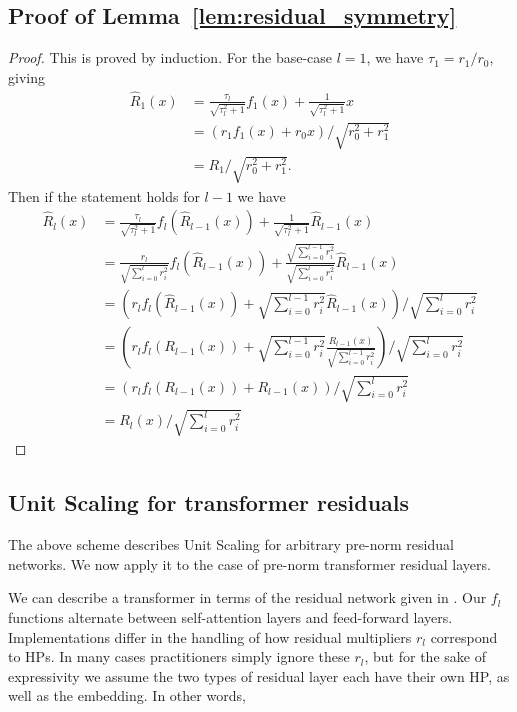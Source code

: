 \subsection{Proof of Lemma~\ref{lem:residual_symmetry}}
\begin{proof}
    This is proved by induction. For the base-case $l=1$, we have $\tau_1 = r_1/r_0$, giving
    \begin{align*}
        \hat{R}_{1}(x) &= \frac{\tau_l}{\sqrt{\tau_l^2 + 1}}f_1(x) + \frac{1}{\sqrt{\tau^2_l + 1}}x
        \\
        &= (r_1f_1(x) + r_0x) / \sqrt{r_0^2 + r_1^2}
        \\
        &= R_1 / \sqrt{r_0^2 + r_1^2}.
    \end{align*}
    Then if the statement holds for $l-1$ we have
    \begin{align*}
        \hat{R}_{l}(x) &= \frac{\tau_l}{\sqrt{\tau^2_l + 1}}f_l(\hat{R}_{l-1}(x)) + \frac{1}{\sqrt{\tau^2_l + 1}}\hat{R}_{l-1}(x)
        \\
        &= \frac{r_l}{\sqrt{\sum_{i=0}^{l}r_i^2}}f_l(\hat{R}_{l-1}(x)) + \frac{\sqrt{ \sum_{i=0}^{l-1}r_i^2}}{\sqrt{\sum_{i=0}^{l}r_i^2}}\hat{R}_{l-1}(x)
        \\
        &= \left(r_l f_l(\hat{R}_{l-1}(x)) + \sqrt{\sum_{i=0}^{l-1}r_i^2} \hat{R}_{l-1}(x)\right) / \sqrt{\sum_{i=0}^{l}r_i^2}
        \\
        &= \left(r_l f_l({R}_{l-1}(x)) + \sqrt{\sum_{i=0}^{l-1}r_i^2} \frac{{R}_{l-1}(x)}{\sqrt{\sum_{i=0}^{l-1}r_i^2}}\right) / \sqrt{\sum_{i=0}^{l}r_i^2}
        \\
        &= \left(r_l f_l({R}_{l-1}(x)) + {R}_{l-1}(x)\right) / \sqrt{\sum_{i=0}^{l}r_i^2}
        \\
        &= R_l(x) / \sqrt{\sum_{i=0}^{l}r_i^2}
    \end{align*}
\end{proof}

\subsection{Unit Scaling for transformer residuals} \label{subsec:unit_scaled_transformer_residuals}

The above scheme describes Unit Scaling for arbitrary pre-norm residual networks. We now apply it to the case of pre-norm transformer residual layers.

We can describe a transformer in terms of the residual network given in . Our $f_l$ functions alternate between self-attention layers and feed-forward layers. Implementations differ in the handling of how residual multipliers $r_l$ correspond to HPs. In many cases practitioners simply ignore these $r_l$, but for the sake of expressivity we assume the two types of residual layer each have their own HP, as well as the embedding. In other words,

